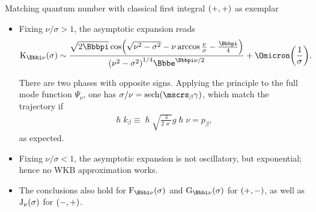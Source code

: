 \documentclass[9pt]{beamer}
\begin{document}
\begin{frame}%
{Matching quantum number with classical first integral}%
{${\left(+,+\right)}$ as exemplar}
\begin{itemize}
\item Fixing $\nu/\sigma>1$, the asymptotic expansion
reads
\begin{align}
\rfun{\mathrm{K}_{\ii \nu}}{\sigma} \sim
\frac{\sqrt{2\pp}\,
\rfun{\cos}{\sqrt{\nu^2-\sigma^2}-\nu\arccos\frac{\nu}{\sigma}-\frac{\pp}{4}}
}{
\rbr{\nu^2-\sigma^2}^{1/4}\ee^{\pp\nu/2}}
+\rfun{\Omicron}{\frac{1}{\sigma}}.
\end{align}

There are two phases with opposite signs. %
Applying the principle to the full mode function $\Psi_\nu$, one has
$\sigma/\nu = \rfun{\sech}{\mscrs_\beta\gamma}$, which match the trajectory if
\begin{align}
\hslash k_\beta \equiv \hslash \sqrt{\frac{3}{2\varkappa}}g\hslash\nu
= p_\beta,
\end{align}
as expected.

\item Fixing $\nu/\sigma<1$, the asymptotic expansion is not oscillatory,
but exponential; hence no WKB approximation works.

\item The conclusions also hold for $\rfun{\mathrm{F}_{\ii\nu}}{\sigma}$
and $\rfun{\mathrm{G}_{\ii\nu}}{\sigma}$ for ${\left(+,-\right)}$, as well as 
${\mathrm{J}_{\nu}}\mathopen{}\left(\sigma\right)\mathclose{}$ for ${\left(-,+\right)}$.
\end{itemize}
\end{frame}
\end{document}
